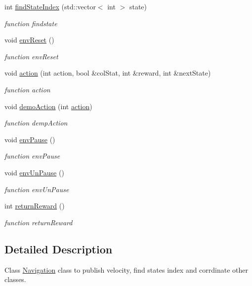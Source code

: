 \begin{DoxyCompactItemize}
int \hyperlink{classNavigation_a634f9154eaca95904c0804c572078721}{find\+State\+Index} (std\+::vector$<$ int $>$ state)
\begin{DoxyCompactList}\small\item\em function findstate \end{DoxyCompactList}\item 
void \hyperlink{classNavigation_af7b698c5d82b1a38e7562d013c9e5eec}{env\+Reset} ()
\begin{DoxyCompactList}\small\item\em function env\+Reset \end{DoxyCompactList}\item 
void \hyperlink{classNavigation_a32c4be93621a8cb447f93d36fcde6189}{action} (int action, bool \&col\+Stat, int \&reward, int \&next\+State)
\begin{DoxyCompactList}\small\item\em function action \end{DoxyCompactList}\item 
void \hyperlink{classNavigation_a44be73dfe68e4d121a0d3eb42cbc721a}{demo\+Action} (int \hyperlink{classNavigation_a32c4be93621a8cb447f93d36fcde6189}{action})
\begin{DoxyCompactList}\small\item\em function demp\+Action \end{DoxyCompactList}\item 
void \hyperlink{classNavigation_add42c3f1fb12406a684ee58f3907677b}{env\+Pause} ()
\begin{DoxyCompactList}\small\item\em function env\+Pause \end{DoxyCompactList}\item 
void \hyperlink{classNavigation_a39c38b3779ab2da402d9dfcbcc1312b2}{env\+Un\+Pause} ()
\begin{DoxyCompactList}\small\item\em function env\+Un\+Pause \end{DoxyCompactList}\item 
int \hyperlink{classNavigation_a52d1f06fc78b601c4d726ee973c55c39}{return\+Reward} ()
\begin{DoxyCompactList}\small\item\em function return\+Reward \end{DoxyCompactList}\end{DoxyCompactItemize}


\subsection{Detailed Description}
Class \hyperlink{classNavigation}{Navigation} class to publish velocity, find states index and corrdinate other classes. 

